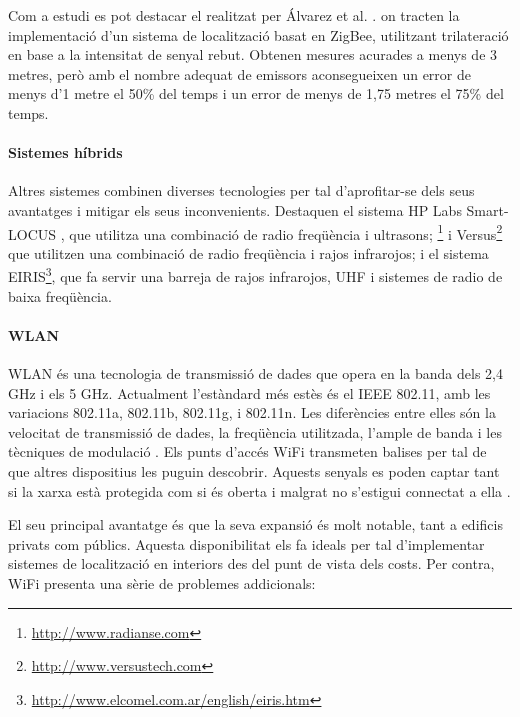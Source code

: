 Com a estudi es pot destacar el realitzat per Álvarez et al. \cite{alvarez}. on tracten la implementació d’un sistema de localització basat en ZigBee, utilitzant trilateració en base a la intensitat de senyal rebut. Obtenen mesures acurades a menys de 3 metres, però amb el nombre adequat de emissors aconsegueixen un error de menys d’1 metre el 50\% del temps i un error de menys de 1,75 metres el 75\% del temps.

\paragraph{Sistemes híbrids}

Altres sistemes combinen diverses tecnologies per tal d'aprofitar-se dels seus avantatges i mitigar els seus inconvenients. Destaquen el sistema HP Labs Smart-LOCUS \cite{oconnor}, que utilitza una combinació de radio freqüència i ultrasons; \footnote{\url{http://www.radianse.com}} i Versus\footnote{\url{http://www.versustech.com}} que utilitzen una combinació de radio freqüència i rajos infrarojos; i el sistema EIRIS\footnote{\url{http://www.elcomel.com.ar/english/eiris.htm}}, que fa servir una barreja de rajos infrarojos, UHF i sistemes de radio de baixa freqüència.

\paragraph{WLAN}

WLAN és una tecnologia de transmissió de dades que opera en la banda dels 2,4 GHz i els 5 GHz. Actualment l'estàndard més estès és el IEEE 802.11, amb les variacions 802.11a, 802.11b, 802.11g, i 802.11n. Les diferències entre elles són la velocitat de transmissió de dades, la freqüència utilitzada, l’ample de banda i les tècniques de modulació \cite{chan}. Els punts d’accés WiFi transmeten balises per tal de que altres dispositius les puguin descobrir. Aquests senyals es poden captar tant si la xarxa està protegida com si és oberta i malgrat no s’estigui connectat a ella \cite{vilaseca}.

El seu principal avantatge és que la seva expansió és molt notable, tant a edificis privats com públics. Aquesta disponibilitat els fa ideals per tal d'implementar sistemes de localització en interiors des del punt de vista dels costs. Per contra, WiFi presenta una sèrie de problemes addicionals:

